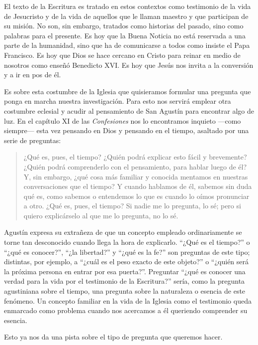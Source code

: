 El texto de la Escritura es tratado en estos contextos como testimonio de la
vida de Jesucristo y de la vida de aquellos que le llaman maestro y que
participan de su misión. No son, sin embargo, tratados como historias del
pasado, sino como palabras para el presente. Es hoy que la Buena Noticia no está
reservada a una parte de la humanidad, sino que ha de comunicarse a todos como
insiste el Papa Francisco. Es hoy que Dios se hace cercano en Cristo para reinar
en medio de nosotros como enseñó Benedicto XVI. Es hoy que Jesús nos invita a la
conversión y a ir en pos de él.

Es sobre esta costumbre de la Iglesia que quisieramos formular una pregunta que
ponga en marcha nuestra investigación. Para esto nos servirá emplear otra
costumbre eclesial y acudir al pensamiento de San Agustín para encontrar algo de
luz. En el capítulo XI de las \emph{Confesiones} nos lo encontramos inquieto
---como siempre--- esta vez pensando en Dios y pensando en el tiempo, asaltado
por una serie de preguntas:

\blockquote[{\cite[XI.14 n.17]{confesiones}}]{¿Qué es, pues, el tiempo? ¿Quién
  podrá explicar esto fácil y brevemente? ¿Quién podrá comprenderlo con el
  pensamiento, para hablar luego de él? Y, sin embargo, ¿qué cosa más familiar y
  conocida mentamos en nuestras conversaciones que el tiempo? Y cuando hablamos
  de él, sabemos sin duda qué es, como sabemos o entendemos lo que es cuando lo
  oímos pronunciar a otro. ¿Qué es, pues, el tiempo? Si nadie me lo pregunta, lo
  sé; pero si quiero explicárselo al que me lo pregunta, no lo sé.}

Agustín expresa su extrañeza de que un concepto empleado ordinariamente se torne
tan desconocido cuando llega la hora de explicarlo. \enquote{¿Qué es el tiempo?}
o \enquote{¿qué es conocer?}, \enquote{¿la libertad?} y \enquote{¿qué es la fe?}
son preguntas de este tipo; distintas, por ejemplo, a \enquote{¿cuál es el peso
  exacto de este objeto?} o \enquote{¿quién será la próxima persona en entrar
  por esa puerta?}.\autocite[Cf.][304]{wittgenstein2005bt} Preguntar
\enquote{¿qué es conocer una verdad para la vida por el testimonio de la
  Escritura?} sería, como la pregunta agustiniana sobre el tiempo, una pregunta
sobre la naturaleza o esencia de este fenómeno. Un concepto familiar en la vida
de la Iglesia como el testimonio queda enmarcado como problema cuando nos
acercamos a él queriendo comprender su esencia.

Esto ya nos da una pista sobre el tipo de pregunta que queremos hacer.


